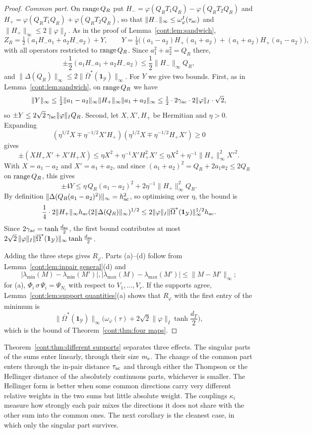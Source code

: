 \begin{proof}
\emph{Common part.} On $\operatorname{range} Q_R$ put $H_-=\varphi(Q_RT_1Q_R)-\varphi(Q_RT_2Q_R)$ and $H_+=\varphi(Q_RT_1Q_R)+\varphi(Q_RT_2Q_R)$, so that $\|H_-\|_\infty\leq\omega^I_\varphi(\tau_{\rm ac})$ and $\|H_+\|_\infty\leq2\|\varphi\|_I$. As in the proof of Lemma~\ref{cont:lem:sandwich},
\[
Z_R=\tfrac12(a_1H_-a_1+a_2H_-a_2)+Y,\qquad Y=\tfrac14\big((a_1-a_2)H_+(a_1+a_2)+(a_1+a_2)H_+(a_1-a_2)\big),
\]
with all operators restricted to $\operatorname{range} Q_R$. Since $a_1^2+a_2^2=Q_R$ there,
\[
\pm\frac12(a_1H_-a_1+a_2H_-a_2)\leq\frac12\|H_-\|_\infty Q_R,
\]
and $\|\Delta(Q_R)\|_\infty\leq2\|\overline{\Omega}^*(\mathbf{1}_{\mathcal{Y}})\|_\infty$. For $Y$ we give two bounds. First, as in Lemma~\ref{cont:lem:sandwich}, on $\operatorname{range} Q_R$ we have
\[
\|Y\|_\infty\leq\tfrac12\|a_1-a_2\|_\infty\|H_+\|_\infty\|a_1+a_2\|_\infty\leq\tfrac12\cdot2\gamma_{\rm ac}\cdot2\|\varphi\|_I\cdot\sqrt2,
\]
so $\pm Y\leq2\sqrt2\,\gamma_{\rm ac}\|\varphi\|_IQ_R$. Second, let $X,X',H_+$ be Hermitian and $\eta>0$. Expanding
\[
(\eta^{1/2}X\mp\eta^{-1/2}X'H_+)(\eta^{1/2}X\mp\eta^{-1/2}H_+X')\geq0
\]
gives
\[
\pm(XH_+X'+X'H_+X)\leq\eta X^2+\eta^{-1}X'H_+^2X'\leq\eta X^2+\eta^{-1}\|H_+\|_\infty^2X'^2 .
\]
With $X=a_1-a_2$ and $X'=a_1+a_2$, and since $(a_1+a_2)^2=Q_R+2a_1a_2\leq2Q_R$ on $\operatorname{range} Q_R$, this gives
\[
\pm4Y\leq\eta\,Q_R(a_1-a_2)^2+2\eta^{-1}\|H_+\|_\infty^2Q_R.
\]
By definition $\|\Delta(Q_R(a_1-a_2)^2)\|_\infty=h_{\rm ac}^2$, so optimising over $\eta$, the bound is
\[
\frac14\cdot2\|H_+\|_\infty h_{\rm ac}(2\|\Delta(Q_R)\|_\infty)^{1/2}\leq2\|\varphi\|_I\|\overline{\Omega}^*(\mathbf{1}_{\mathcal{Y}})\|_\infty^{1/2}h_{\rm ac}.
\]
Since $2\gamma_{\rm ac}=\tanh\frac{d_{\rm ac}}2$, the first bound contributes at most $2\sqrt2\,\|\varphi\|_I\|\overline{\Omega}^*(\mathbf{1}_{\mathcal{Y}})\|_\infty\tanh\frac{d_{\rm ac}}2$.

Adding the three steps gives $R_\varphi$. Parts (a)--(d) follow from Lemma~\ref{cont:lem:inpair general}(d) and
\[
|\lambda_{\min}(M)-\lambda_{\min}(M')|,|\lambda_{\max}(M)-\lambda_{\max}(M')|\leq\|M-M'\|_\infty;
\]
for (a), $\Phi_i\,\sigma\,\Psi_i=\Psi_{N_i}$ with respect to $V_1,\dots,V_r$. If the supports agree, Lemma~\ref{cont:lem:support quantities}(a) shows that $R_\varphi$ with the first entry of the minimum is
\[
\|\overline{\Omega}^*(\mathbf{1}_{\mathcal{Y}})\|_\infty\Big(\omega_\varphi(\tau)+2\sqrt2\|\varphi\|_I\tanh\frac{d_T}{2}\Big),
\]
which is the bound of Theorem~\ref{cont:thm:four maps}.
\end{proof}

Theorem~\ref{cont:thm:different supports} separates three effects. The singular parts of the sums enter linearly, through their size $m_{\rm s}$. The change of the common part enters through the in-pair distance $\tau_{\rm ac}$ and through either the Thompson or the Hellinger distance of the absolutely continuous parts, whichever is smaller. The Hellinger form is better when some common directions carry very different relative weights in the two sums but little absolute weight. The couplings $\kappa_i$ measure how strongly each pair mixes the directions it does not share with the other sum into the common ones. The next corollary is the cleanest case, in which only the singular part survives.

